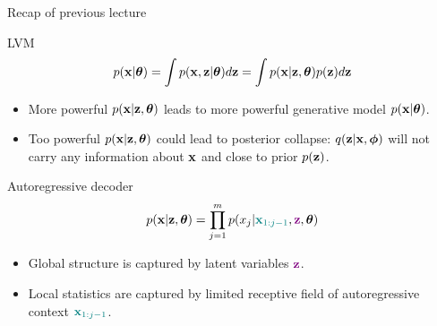 

\usepackage{tikz}

\usetikzlibrary{arrows,shapes,positioning,shadows,trees}

\begin{frame}
\titlepage
\end{frame}
\begin{frame}{Recap of previous lecture}
	\begin{block}{LVM}
		\vspace{-0.3cm}
		\[
		    p(\mathbf{x} | \boldsymbol{\theta}) = \int p(\mathbf{x}, \mathbf{z} | \boldsymbol{\theta}) d \mathbf{z} = \int p(\mathbf{x} | \mathbf{z}, \boldsymbol{\theta}) p(\mathbf{z}) d \mathbf{z} 
		\]
		\vspace{-0.3cm}
	\end{block}
	\begin{itemize}
		\item More powerful $p(\mathbf{x} | \mathbf{z}, \boldsymbol{\theta})$ leads to more powerful generative model $p(\mathbf{x} | \boldsymbol{\theta})$.
		\item Too powerful $p(\mathbf{x} | \mathbf{z}, \boldsymbol{\theta})$ could lead to posterior collapse: $q(\mathbf{z} | \mathbf{x}, \boldsymbol{\phi})$ will not carry any information about $\mathbf{x}$ and close to prior $p(\mathbf{z})$.
	\end{itemize}
	\begin{block}{Autoregressive decoder}
		\vspace{-0.2cm}
		\[
		p(\mathbf{x} | \mathbf{z} , \boldsymbol{\theta}) = \prod_{j=1}^m p(x_j | {\color{teal}\mathbf{x}_{1:j - 1}}, {\color{violet}\mathbf{z}}, \boldsymbol{\theta})
		\]
		\begin{itemize}
			\item Global structure is captured by latent variables ${\color{violet}\mathbf{z}}$.
			\item Local statistics are captured by limited receptive field of autoregressive context ${\color{teal}\mathbf{x}_{1:j - 1}}$.
		\end{itemize}
	\end{block}
	
\end{frame}
